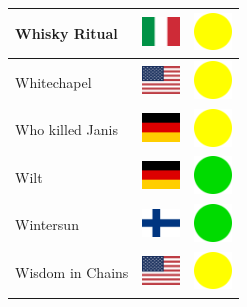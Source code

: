\documentclass[12pt, a4paper, twoside]{report}
\begin{document}
\begin{center}
\begin{longtable}{|p{5cm}|p{2cm}|p{2cm}|}
 Whisky Ritual                                              & \includegraphics[width=1cm]{../img/flags/it} &   \includegraphics[width=1cm]{../likes/m} \\ \hline
 Whitechapel                                                & \includegraphics[width=1cm]{../img/flags/us} &   \includegraphics[width=1cm]{../likes/m} \\ \hline
 Who killed Janis                                           & \includegraphics[width=1cm]{../img/flags/de} &   \includegraphics[width=1cm]{../likes/m} \\ \hline
 Wilt                                                       & \includegraphics[width=1cm]{../img/flags/de} &   \includegraphics[width=1cm]{../likes/y} \\ \hline
 Wintersun                                                  & \includegraphics[width=1cm]{../img/flags/fi} &   \includegraphics[width=1cm]{../likes/y} \\ \hline
 Wisdom in Chains                                           & \includegraphics[width=1cm]{../img/flags/us} &   \includegraphics[width=1cm]{../likes/m} \\ \hline

\end{longtable}
\end{center}
\end{document}
